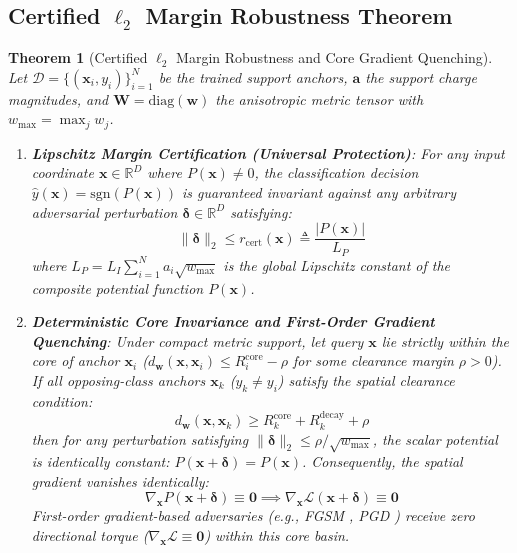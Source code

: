 \documentclass[times, review, 10pt]{elsarticle}
\newtheorem{theorem}{Theorem}
\begin{document}
\subsection{Certified $\ell_2$ Margin Robustness Theorem}
\begin{theorem}[Certified $\ell_2$ Margin Robustness and Core Gradient Quenching]
\label{thm:robustness}
Let $\mathcal{D} = \{(\mathbf{x}_i, y_i)\}_{i=1}^N$ be the trained support anchors, $\mathbf{a}$ the support charge magnitudes, and $\mathbf{W} = \mathrm{diag}(\mathbf{w})$ the anisotropic metric tensor with $w_{\max} = \max_j w_j$.

\begin{enumerate}
    \item \textbf{Lipschitz Margin Certification (Universal Protection)}: For any input coordinate $\mathbf{x} \in \mathbb{R}^D$ where $P(\mathbf{x}) \ne 0$, the classification decision $\hat{y}(\mathbf{x}) = \mathrm{sgn}(P(\mathbf{x}))$ is guaranteed invariant against any arbitrary adversarial perturbation $\boldsymbol{\delta} \in \mathbb{R}^D$ satisfying:
    \begin{equation}
    \|\boldsymbol{\delta}\|_2 \le r_{\mathrm{cert}}(\mathbf{x}) \triangleq \frac{|P(\mathbf{x})|}{L_P}
    \label{eq:cert_radius}
    \end{equation}
    where $L_P = L_I \sum_{i=1}^N a_i \sqrt{w_{\max}}$ is the global Lipschitz constant of the composite potential function $P(\mathbf{x})$.
    
    \item \textbf{Deterministic Core Invariance and First-Order Gradient Quenching}: Under compact metric support, let query $\mathbf{x}$ lie strictly within the core of anchor $\mathbf{x}_i$ ($d_{\mathbf{w}}(\mathbf{x}, \mathbf{x}_i) \le R_i^{\mathrm{core}} - \rho$ for some clearance margin $\rho > 0$). If all opposing-class anchors $\mathbf{x}_k$ ($y_k \ne y_i$) satisfy the spatial clearance condition:
    \begin{equation}
    d_{\mathbf{w}}(\mathbf{x}, \mathbf{x}_k) \ge R_k^{\mathrm{core}} + R_k^{\mathrm{decay}} + \rho
    \label{eq:clearance_cond}
    \end{equation}
    then for any perturbation satisfying $\|\boldsymbol{\delta}\|_2 \le \rho / \sqrt{w_{\max}}$, the scalar potential is identically constant: $P(\mathbf{x} + \boldsymbol{\delta}) = P(\mathbf{x})$. Consequently, the spatial gradient vanishes identically:
    \begin{equation}
    \nabla_{\mathbf{x}} P(\mathbf{x} + \boldsymbol{\delta}) \equiv \mathbf{0} \implies \nabla_{\mathbf{x}} \mathcal{L}(\mathbf{x} + \boldsymbol{\delta}) \equiv \mathbf{0}
    \end{equation}
    First-order gradient-based adversaries (e.g., FGSM \cite{goodfellow2014explaining}, PGD \cite{madry2018towards}) receive zero directional torque ($\nabla_{\mathbf{x}} \mathcal{L} \equiv \mathbf{0}$) within this core basin.
\end{enumerate}
\end{theorem}
\end{document}
